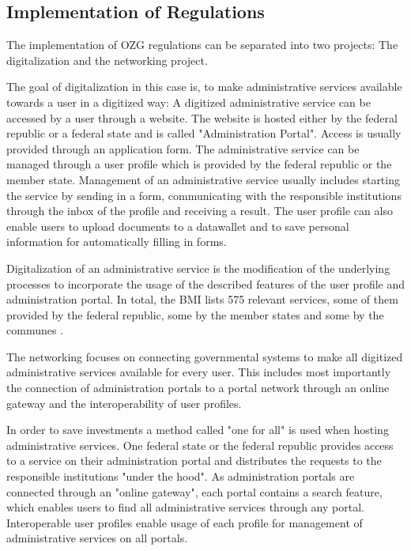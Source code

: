 \subsection{Implementation of Regulations}

The implementation of OZG regulations can be separated into two projects: The digitalization and the networking project.

The goal of digitalization in this case is, to make administrative services available towards a user in a digitized way: A digitized administrative service can be accessed by a user through a website. The website is hosted either by the federal republic or a federal state and is called "Administration Portal". Access is usually provided through an application form. The administrative service can be managed through a user profile which is provided by the federal republic or the member state. Management of an administrative service usually includes starting the service by sending in a form, communicating with the responsible institutions through the inbox of the profile and receiving a result. The user profile can also enable users to upload documents to a datawallet and to save personal information for automatically filling in forms.

Digitalization of an administrative service is the modification of the underlying processes to incorporate the usage of the described features of the user profile and administration portal. In total, the BMI lists 575 relevant services, some of them provided by the federal republic, some by the member states and some by the communes \cite{BMI:Onlinezugangsgesetz}.

The networking focuses on connecting governmental systems to make all digitized administrative services available for every user. This includes most importantly the connection of administration portals to a portal network through an online gateway and the interoperability of user profiles.

In order to save investments a method called "one for all" is used when hosting administrative services. One federal state or the federal republic provides access to a service on their administration portal and distributes the requests to the responsible institutions "under the hood". As administration portals are connected through an "online gateway", each portal contains a search feature, which enables users to find all administrative services through any portal. Interoperable user profiles enable usage of each profile for management of administrative services on all portals.


